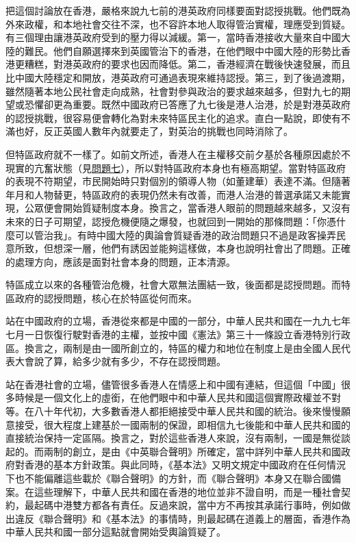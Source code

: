把這個討論放在香港，嚴格來說九七前的港英政府同樣要面對認授挑戰。他們既為外來政權，和本地社會交往不深，也不容許本地人取得管治實權，理應受到質疑。有三個理由讓港英政府受到的壓力得以減緩。第一，當時香港接收大量來自中國大陸的難民。他們自願選擇來到英國管治下的香港，在他們眼中中國大陸的形勢比香港更糟糕，對港英政府的要求也因而降低。第二，香港經濟在戰後快速發展，而且比中國大陸穩定和開放，港英政府可通過表現來維持認授。第三，到了後過渡期，雖然隨著本地公民社會走向成熟，社會對參與政治的要求越來越多，但對九七的期望或恐懼卻更為重要。既然中國政府已答應了九七後是港人治港，於是對港英政府的認授挑戰，很容易便會轉化為對未來特區民主化的追求。直白一點說，即使有不滿也好，反正英國人數年內就要走了，對英治的挑戰也同時消除了。

但特區政府就不一樣了。如前文所述，香港人在主權移交前夕基於各種原因處於不現實的亢奮狀態（見\hyperref[sec:sec7]{問題七}），所以對特區政府本身也有極高期望。當對特區政府的表現不符期望，市民開始時只對個別的領導人物（如董建華）表達不滿。但隨著年月和人物替更，特區政府的表現仍然未有改善，而港人治港的普選承諾又未能實現，公眾便會開始質疑制度本身。換言之，當香港人眼前的問題越來越多，又沒有未來的日子可期望，認授危機便隨之爆發，也就回到一開始的那條問題：「你憑什麼可以管治我」。有時中國大陸的輿論會質疑香港的政治問題只不過是政客操弄民意所致，但想深一層，他們有誘因並能夠這樣做，本身也說明社會出了問題。正確的處理方向，應該是面對社會本身的問題，正本清源。

特區成立以來的各種管治危機，社會大眾無法團結一致，後面都是認授問題。而特區政府的認授問題，核心在於特區從何而來。

站在中國政府的立場，香港從來都是中國的一部分，中華人民共和國在一九九七年七月一日恢復行駛對香港的主權，並按中國《憲法》第三十一條設立香港特別行政區。換言之，兩制是由一國所創立的，特區的權力和地位在制度上是由全國人民代表大會說了算，給多少就有多少，不存在認授問題。

站在香港社會的立場，儘管很多香港人在情感上和中國有連結，但這個「中國」很多時候是一個文化上的虛銜，在他們眼中和中華人民共和國這個實際政權並不對等。在八十年代初，大多數香港人都拒絕接受中華人民共和國的統治。後來慢慢願意接受，很大程度上建基於一國兩制的保證，即相信九七後能和中華人民共和國的直接統治保持一定區隔。換言之，對於這些香港人來說，沒有兩制，一國是無從談起的。而兩制的創立，是由《中英聯合聲明》所確定，當中詳列中華人民共和國政府對香港的基本方針政策。與此同時，《基本法》又明文規定中國政府在任何情況下也不能偏離這些載於《聯合聲明》的方針，而《聯合聲明》本身又在聯合國備案。在這些理解下，中華人民共和國在香港的地位並非不證自明，而是一種社會契約，最起碼中港雙方都各有責任。反過來說，當中方不再按其承諾行事時，例如做出違反《聯合聲明》和《基本法》的事情時，則最起碼在道義上的層面，香港作為中華人民共和國一部分這點就會開始受輿論質疑了。

